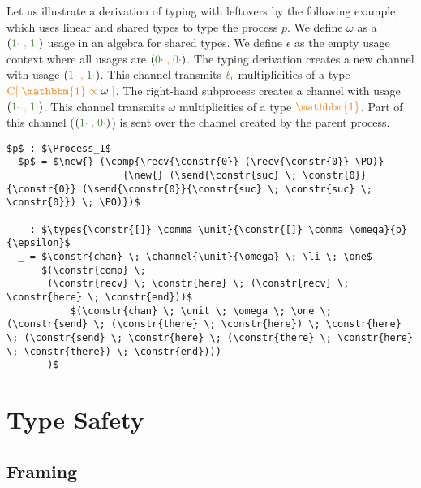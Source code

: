 \documentclass[a4paper,UKenglish,cleveref,autoref,thm-restate,authorcolumns]{lipics-v2019}
\theoremstyle{definition}
\newcommand{\type}[1]{\textcolor{BlueViolet}{\operatorname{#1}}}
\newcommand{\constr}[1]{\textcolor{BurntOrange}{\operatorname{#1}}}
\newcommand{\func}[1]{\textcolor{OliveGreen}{\operatorname{#1}}}
\newcommand{\PO}{\constr{\mathbb{0}}}
\newcommand{\comp}[2]{#1 \; \constr{\parallel} \; #2}
\newcommand{\new}{\constr{\boldsymbol{\nu}} \;}
\newcommand{\send}[2]{#1 \; \constr{\langle} \; #2 \;\constr{\rangle} \;}
\newcommand{\recv}[1]{#1 \; \constr{\mathbb{()}} \;}
\newcommand{\unit}{\constr{\mathbbm{1}}}
\newcommand{\channel}[2]{\constr{C[} \; #1 \; \constr{\propto} \; #2 \; \constr{]}}
\newcommand{\comma}{\; \constr{,} \;}
\newcommand{\zero}{\func{0\cdot}}
\newcommand{\one}{\func{1\cdot}}
\newcommand{\li}{\func{\ell_i}}
\newcommand{\types}[4]{#1 \; \type{\propto} \; #2 \; \type{\vdash} \; #3 \; \type{\boxtimes} \; #4}
\newcommand{\Process}{\type{PROCESS}}
\begin{document}
\begin{example}
  \label{example-derivations}
  Let us illustrate a derivation of typing with leftovers by the following example, which uses linear and shared types to type the process $p$. 
  We define $\omega$ as a $(\one \comma \one)$ usage in an algebra for shared types.
  We define $\epsilon$ as the empty usage context where all usages are $(\zero \comma \zero)$.
  The typing derivation creates a new channel with usage $(\one \comma \one)$.
  This channel transmits $\li$ multiplicities of a type $\channel{\unit}{\omega}$.
  The right-hand subprocess creates a channel with usage $(\one \comma \one)$.
  This channel transmits $\omega$ multiplicities of a type $\unit$.
  Part of this channel ($(\one \comma \zero)$) is sent over the channel created by the parent process.
  
  \begin{lstlisting}[mathescape]
  $p$ : $\Process_1$
  $p$ = $\new{} (\comp{\recv{\constr{0}} (\recv{\constr{0}} \PO)}
                    {\new{} (\send{\constr{suc} \; \constr{0}} {\constr{0}} (\send{\constr{0}}{\constr{suc} \; \constr{suc} \; \constr{0}}) \; \PO)})$

  _ : $\types{\constr{[]} \comma \unit}{\constr{[]} \comma \omega}{p}{\epsilon}$
  _ = $\constr{chan} \; \channel{\unit}{\omega} \; \li \; \one$
      $(\constr{comp} \;
       (\constr{recv} \; \constr{here} \; (\constr{recv} \; \constr{here} \; \constr{end}))$
           $(\constr{chan} \; \unit \; \omega \; \one \; (\constr{send} \; (\constr{there} \; \constr{here}) \; \constr{here} \; (\constr{send} \; \constr{here} \; (\constr{there} \; \constr{here} \; \constr{there}) \; \constr{end})))
       )$
  \end{lstlisting}
\end{example}


\section{Type Safety}
\label{type-safety}

\subsection{Framing}
\label{framing}
\end{document}
